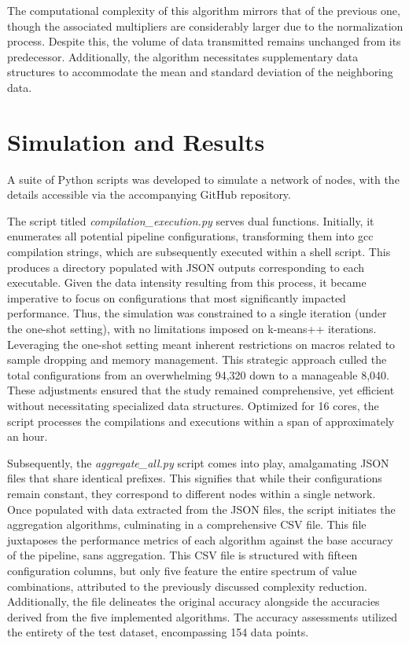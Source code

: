 The computational complexity of this algorithm mirrors that of the previous one, though the associated multipliers are considerably larger due to the normalization process. Despite this, the volume of data transmitted remains unchanged from its predecessor. Additionally, the algorithm necessitates supplementary data structures to accommodate the mean and standard deviation of the neighboring data.


\section{Simulation and Results}
\label{sec:simulation}
A suite of Python scripts was developed to simulate a network of nodes, with the details accessible via the accompanying GitHub repository.

The script titled \emph{compilation\_execution.py} serves dual functions. Initially, it enumerates all potential pipeline configurations, transforming them into gcc compilation strings, which are subsequently executed within a shell script. This produces a directory populated with JSON outputs corresponding to each executable. Given the data intensity resulting from this process, it became imperative to focus on configurations that most significantly impacted performance. Thus, the simulation was constrained to a single iteration (under the one-shot setting), with no limitations imposed on k-means++ iterations. Leveraging the one-shot setting meant inherent restrictions on macros related to sample dropping and memory management. This strategic approach culled the total configurations from an overwhelming 94,320 down to a manageable 8,040. These adjustments ensured that the study remained comprehensive, yet efficient without necessitating specialized data structures. Optimized for 16 cores, the script processes the compilations and executions within a span of approximately an hour.

Subsequently, the \emph{aggregate\_all.py} script comes into play, amalgamating JSON files that share identical prefixes. This signifies that while their configurations remain constant, they correspond to different nodes within a single network. Once populated with data extracted from the JSON files, the script initiates the aggregation algorithms, culminating in a comprehensive CSV file. This file juxtaposes the performance metrics of each algorithm against the base accuracy of the pipeline, sans aggregation. This CSV file is structured with fifteen configuration columns, but only five feature the entire spectrum of value combinations, attributed to the previously discussed complexity reduction. Additionally, the file delineates the original accuracy alongside the accuracies derived from the five implemented algorithms. The accuracy assessments utilized the entirety of the test dataset, encompassing 154 data points.


